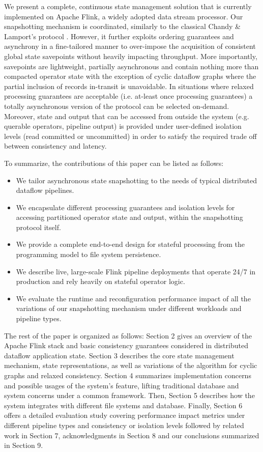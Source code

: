 We present a complete, continuous state management solution that is currently implemented on Apache Flink, a widely adopted data stream processor. Our snapshotting mechanism is coordinated, similarly to the classical Chandy \& Lamport's protocol \cite{chandy1985distributed}. However, it further exploits ordering guarantees and asynchrony in a fine-tailored manner to over-impose the acquisition of consistent global state savepoints without heavily impacting throughput. More importantly, savepoints are lightweight, partially asynchronous and contain nothing more than compacted operator state with the exception of cyclic dataflow graphs where the partial inclusion of records in-transit is unavoidable. In situations where relaxed processing guarantees are acceptable (i.e. at-least once processing guarantees) a totally asynchronous version of the protocol can be selected on-demand. Moreover, state and output that can be accessed from outside the system (e.g. querable operators, pipeline output) is provided under user-defined isolation levels (read committed or uncommitted) in order to satisfy the required trade off between consistency and latency.

To summarize, the contributions of this paper can be listed as follows:

\begin{itemize}
	\item We tailor asynchronous state snapshotting to the needs of typical distributed dataflow pipelines.
	\item We encapsulate different processing guarantees and isolation levels for accessing partitioned operator state and output, within the snapshotting protocol itself.
	\item We provide a complete end-to-end design for stateful processing from the programming model to file system persistence.
	\item We describe live, large-scale Flink pipeline deployments that operate 24/7 in production and rely heavily on stateful operator logic.
	\item We evaluate the runtime and reconfiguration performance impact of all the variations of our snapshotting mechanism under different workloads and pipeline types.
\end{itemize}

The rest of the paper is organized as follows: Section 2 gives an overview of the Apache Flink stack and basic consistency guarantees considered in distributed dataflow application state. Section 3 describes the core state management mechanism, state representations, as well as variations of the algorithm for cyclic graphs and relaxed consistency. Section 4 summarizes implementation concerns and possible usages of the system's feature, lifting traditional database and system concerns under a common framework. Then, Section 5 describes how the system integrates with different file systems and database. Finally, Section 6 offers a detailed evaluation study covering performance impact metrics under different pipeline types and consistency or isolation levels followed by related work in Section 7, acknowledgments in Section 8 and our conclusions summarized in Section 9.
